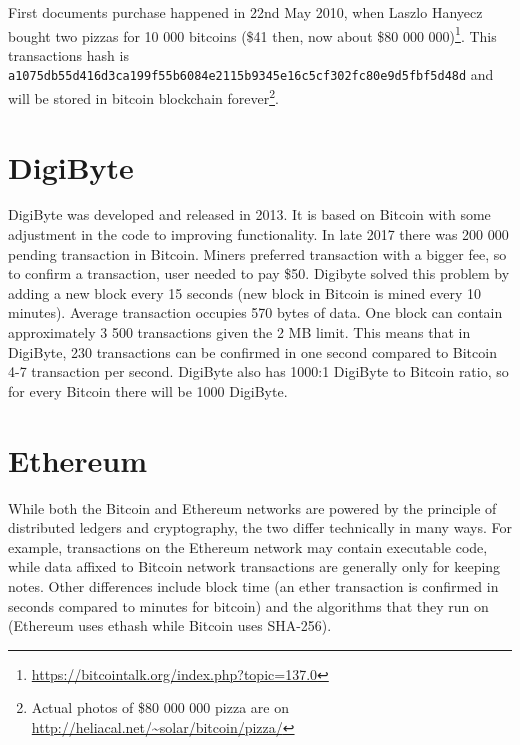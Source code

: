 First documents purchase happened in 22nd May 2010, when Laszlo Hanyecz bought two pizzas for 10 000 bitcoins (\$41 then, now about \$80 000 000)\footnote{\url{https://bitcointalk.org/index.php?topic=137.0}}. This transactions hash is \texttt{a1075db55d416d3ca199f55b6084e\-2115b9345e16c5cf302fc80e9d5fbf5d48d} and will be stored in bitcoin blockchain forever\footnote{Actual photos of \$80 000 000 pizza are on \url{http://heliacal.net/~solar/bitcoin/pizza/}}.


\section{DigiByte}
DigiByte was developed and released in 2013. It is based on Bitcoin with some adjustment in the code to improving functionality. In late 2017 there was 200 000 pending transaction in Bitcoin. Miners preferred transaction with a bigger fee, so to confirm a transaction, user needed to pay \$50. Digibyte solved this problem by adding a new block every 15 seconds (new block in Bitcoin is mined every 10 minutes). Average transaction occupies 570 bytes of data. One block can contain approximately 3 500 transactions given the 2 MB limit. This means that in DigiByte, 230 transactions can be confirmed in one second compared to Bitcoin 4-7 transaction per second. DigiByte also has 1000:1 DigiByte to Bitcoin ratio, so for every Bitcoin there will be 1000 DigiByte.\cite{digibyteBook}


\section{Ethereum}
While both the Bitcoin and Ethereum networks are powered by the principle of distributed ledgers and cryptography, the two differ technically in many ways. For example, transactions on the Ethereum network may contain executable code, while data affixed to Bitcoin network transactions are generally only for keeping notes. Other differences include block time (an ether transaction is confirmed in seconds compared to minutes for bitcoin) and the algorithms that they run on (Ethereum uses ethash while Bitcoin uses SHA-256).\cite{wood2014ethereum}



